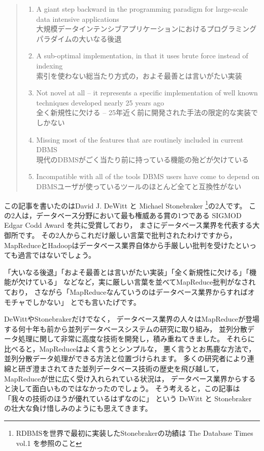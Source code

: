 \begin{quote}
\begin{enumerate}
 \item A giant step backward in the programming paradigm for large-scale data intensive applications \\
	   大規模データインテンシブアプリケーションにおけるプログラミングパラダイムの大いなる後退
 \item A sub-optimal implementation, in that it uses brute force instead of indexing \\
	   索引を使わない総当たり方式の，およそ最善とは言いがたい実装
 \item Not novel at all -- it represents a specific implementation of well known techniques developed nearly 25 years ago \\
	   全く新規性に欠ける -- 25年近く前に開発された手法の限定的な実装でしかない
 \item Missing most of the features that are routinely included in current DBMS \\
	   現代のDBMSがごく当たり前に持っている機能の殆どが欠けている
 \item Incompatible with all of the tools DBMS users have come to depend on \\
	   DBMSユーザが使っているツールのほとんど全てと互換性がない
\end{enumerate}
\end{quote}

この記事を書いたのはDavid J. DeWitt と Michael Stonebraker \footnote{RDBMSを世界で最初に実装したStonebrakerの功績は The Database Times vol.1 を参照のこと}の2人です。
この2人は，データベース分野において最も権威ある賞の1つである SIGMOD Edgar Codd Award を共に受賞しており，
まさにデータベース業界を代表する大御所です。
その2人からこれだけ厳しい言葉で批判されたわけですから，
MapReduceとHadoopはデータベース業界自体から手厳しい批判を受けたといっても過言ではないでしょう。

「大いなる後退」「およそ最善とは言いがたい実装」「全く新規性に欠ける」「機能が欠けている」
などなど，実に厳しい言葉を並べてMapReduce批判がなされており，
さながら「MapReduceなんていうのはデータベース業界からすればオモチャでしかない」
とでも言いたげです。

DeWittやStonebrakerだけでなく，
データベース業界の人々はMapReduceが登場する何十年も前から並列データベースシステムの研究に取り組み，
並列分散データ処理に関して非常に高度な技術を開発し，積み重ねてきました。
それらに比べると，MapReduceはよく言うとシンプルな，
悪く言うとお馬鹿な方法で，並列分散データ処理ができる方法と位置づけられます。
多くの研究者により連綿と研ぎ澄まされてきた並列データベース技術の歴史を飛び越して，
MapReduceが世に広く受け入れられている状況は，
データベース業界からすると決して面白いものではなかったのでしょう。
そう考えると，この記事は「我々の技術のほうが優れているはずなのに」
という DeWitt と Stonebraker の壮大な負け惜しみのようにも思えてきます。

